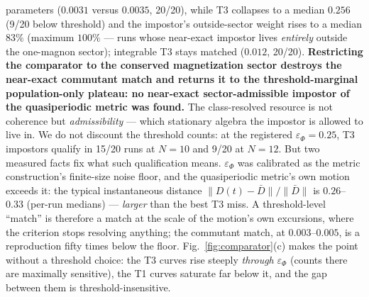\documentclass[a4paper,11pt,noarxiv]{quantumarticle}
\newcommand{\ephi}{\varepsilon_\Phi}
\begin{document}
parameters ($0.0031$ versus $0.0035$, 20/20), while T3 collapses to a
median $0.256$ (9/20 below threshold) and the impostor's
outside-sector weight rises to a median $83\%$ (maximum $100\%$ ---
runs whose near-exact impostor lives \emph{entirely} outside the
one-magnon sector); integrable T3 stays matched ($0.012$, 20/20).
\textbf{Restricting the comparator to the conserved magnetization
sector destroys the near-exact commutant match and returns it to the
threshold-marginal population-only plateau: no near-exact
sector-admissible impostor of the quasiperiodic metric was found.}
The class-resolved resource is not coherence but \emph{admissibility}
--- which stationary algebra the impostor is allowed to live in. We
do not discount the threshold counts: at the registered $\ephi =
0.25$, T3 impostors qualify in 15/20 runs at $N{=}10$ and 9/20 at
$N{=}12$. But two measured facts fix what such qualification means.
$\ephi$ was calibrated as the metric construction's finite-size noise
floor, and the quasiperiodic metric's own motion exceeds it: the
typical instantaneous distance $\lVert D(t)-\bar D\rVert/\lVert\bar
D\rVert$ is $0.26$--$0.33$ (per-run medians) --- \emph{larger} than
the best T3 miss. A threshold-level ``match'' is therefore a match at
the scale of the motion's own excursions, where the criterion stops
resolving anything; the commutant match, at $0.003$--$0.005$, is a
reproduction fifty times below the floor. Fig.~\ref{fig:comparator}(c)
makes the point without a threshold choice: the T3 curves rise
steeply \emph{through} $\ephi$ (counts there are maximally
sensitive), the T1 curves saturate far below it, and the gap between
them is threshold-insensitive.
\end{document}
